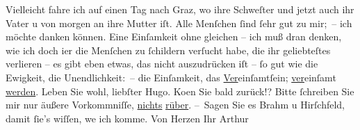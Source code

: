 \begin{ledgroupsized}[t]{13cm}
           \pstart
           Vielleicht fahre ich auf einen Tag nach Graz, wo
               ihre Schweſter und jetzt
               auch ihr Vater u von morgen
               an ihre Mutter iſt. Alle
               Menſchen ſind ſehr gut zu mir; – ich möchte danken können. Eine Einſamkeit ohne
               gleichen – ich muß dran denken, wie ich doch i{\geminationm}er die
               Menſchen zu ſchildern verſucht habe, die ihr geliebteſtes verlieren – {\pb}es gibt eben etwas, das nicht auszudrücken iſt – ſo gut
               wie die Ewigkeit, die Unendlichkeit: – die Einſamkeit, das \uline{Ver}einſamtſein; \uline{ver}einſamt \uline{werden}.\pend
           \pstart
           Leben Sie wohl, liebſter Hugo. Ko{\geminationm}en Sie bald zurück!?
               Bitte ſchreiben Sie mir nur äußere Vorkommniſſe, \uline{nichts}{ }\uline{rüber}.\pend
           \pstart
           – Sagen Sie es Brahm u Hirſchfeld, damit ſie’s wiſſen, we{\geminationn} ich komme.\pend
           \pstart Von Herzen Ihr \spacefill\mbox{Arthur}\pend{}
         
         \endnumbering{}\end{ledgroupsized}  \newcommand{\dateiname}{L00908}\newcommand{\titel}{Arthur Schnitzler an Hugo von Hofmannsthal, 22. 3. 1899}\newcommand{\editorInnen}{Martin Anton Müller und Gerd-Hermann Susen}
      